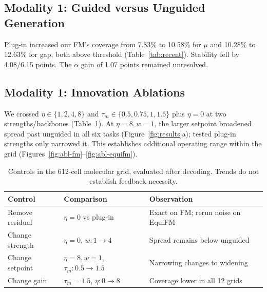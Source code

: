 \documentclass{article}
\begin{document}
\subsection{Modality 1: Guided versus Unguided Generation}\label{sec:guidworks}
Plug-in increased our FM's coverage from 7.83\% to 10.58\% for $\mu$ and 10.28\% to 12.63\% for gap, both above threshold (Table~\ref{tab:recent}). Stability fell by 4.08/6.15 points. The $\alpha$ gain of 1.07 points remained unresolved.

\subsection{Modality 1: Innovation Ablations}\label{sec:ablations}
We crossed $\eta\in\{1,2,4,8\}$ and $\tau_m\in\{0.5,0.75,1,1.5\}$ plus $\eta=0$ at two strengths/backbones (Table~\ref{tab:ablation}). At $\eta=8,w=1$, the larger setpoint broadened spread past unguided in all six tasks (Figure~\ref{fig:results}a); tested plug-in strengths only narrowed it. This establishes additional operating range within the grid (Figures~\ref{fig:abl-fm}--\ref{fig:abl-equifm}).
\begin{table}[!htbp]
\centering\small
\caption{Controls in the 612-cell molecular grid, evaluated after decoding. Trends do not establish feedback necessity.}
\label{tab:ablation}
\begin{tabular}{lll}
\toprule
Control & Comparison & Observation\\
\midrule
Remove residual & $\eta=0$ vs plug-in & Exact on FM; rerun noise on EquiFM\\
Change strength & $\eta=0$, $w:1\to4$ & Spread remains below unguided\\
Change setpoint & $\eta=8,w=1$, $\tau_m:0.5\to1.5$ & Narrowing changes to widening\\
Change gain & $\tau_m=1.5$, $\eta:0\to8$ & Coverage lower in all 12 grids\\
\bottomrule
\end{tabular}
\end{table}
\end{document}
